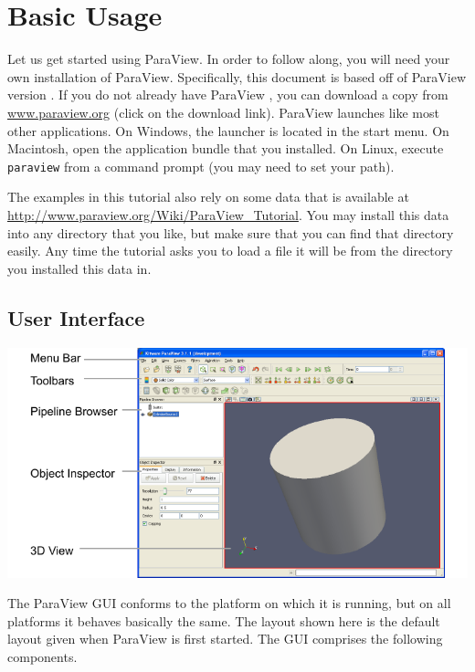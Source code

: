 \chapter{Basic Usage}
\label{chap:BasicUsage}

Let us get started using ParaView.  In order to follow along, you will need
your own installation of ParaView.  Specifically, this document is based
off of ParaView version \pvversion.  If you do not already have ParaView
\pvversion, you can download a copy from
\href{http://www.paraview.org}{www.paraview.org} (click on the download
link).  ParaView launches like most other applications.  On Windows, the
launcher is located in the start menu.  On Macintosh, open the application
bundle that you installed.  On Linux, execute \texttt{paraview} from a
command prompt (you may need to set your path).

The examples in this tutorial also rely on some data that is available at
\href{http://www.paraview.org/Wiki/ParaView_Tutorial}{http://www.paraview.org/Wiki/ParaView\_Tutorial}.
You may install this data into any directory that you like, but make sure
that you can find that directory easily.  Any time the tutorial asks you to
load a file it will be from the directory you installed this data in.


\section{User Interface}

\begin{inlinefig}
  \includegraphics{images/UserInterface}
\end{inlinefig}

The ParaView GUI conforms to the platform on which it is running, but on
all platforms it behaves basically the same.  The layout shown here is the
default layout given when ParaView is first started.  The GUI comprises the
following components.

